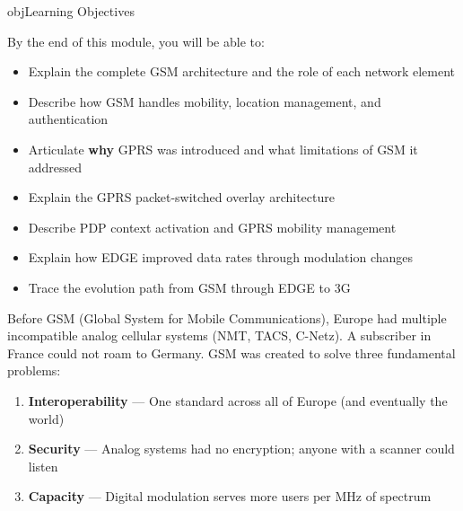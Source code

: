 \begin{CNbox}[unbreakable]{obj}{Learning Objectives}

By the end of this module, you will be able to:

\begin{itemize}
\tightlist
\item
  Explain the complete GSM architecture and the role of each network element
\item
  Describe how GSM handles mobility, location management, and authentication
\item
  Articulate \textbf{why} GPRS was introduced and what limitations of GSM it addressed
\item
  Explain the GPRS packet-switched overlay architecture
\item
  Describe PDP context activation and GPRS mobility management
\item
  Explain how EDGE improved data rates through modulation changes
\item
  Trace the evolution path from GSM through EDGE to 3G
\end{itemize}

\end{CNbox}



\CNchained{}

Before GSM (Global System for Mobile Communications), Europe had multiple incompatible analog cellular systems (NMT, TACS, C-Netz). A subscriber in France could not roam to Germany. GSM was created to solve three fundamental problems:

\begin{enumerate}
\def\labelenumi{\arabic{enumi}.}
\tightlist
\item
  \textbf{Interoperability} — One standard across all of Europe (and eventually the world)
\item
  \textbf{Security} — Analog systems had no encryption; anyone with a scanner could listen
\item
  \textbf{Capacity} — Digital modulation serves more users per MHz of spectrum
\end{enumerate}




